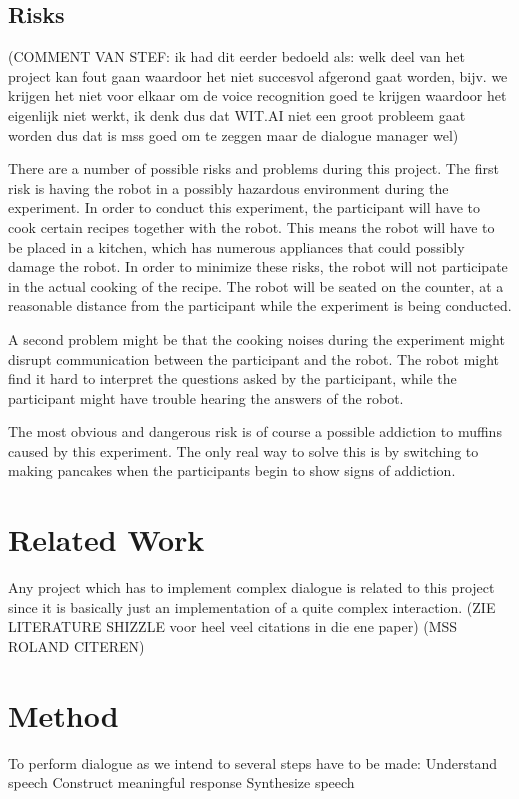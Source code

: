 \documentclass[11pt]{article} %
\begin{document}
\subsection{Risks} (COMMENT VAN STEF: ik had dit eerder bedoeld als: welk deel van het project kan fout gaan waardoor het niet succesvol afgerond gaat worden, bijv. we krijgen het niet voor elkaar om de voice recognition goed te krijgen waardoor het eigenlijk niet werkt, ik denk dus dat WIT.AI niet een groot probleem gaat worden dus dat is mss goed om te zeggen maar de dialogue manager wel)

There are a number of possible risks and problems during this project. The first risk is having the robot in a possibly hazardous environment during the experiment. In order to conduct this experiment, the participant will have to cook certain recipes together with the robot. This means the robot will have to be placed in a kitchen, which has numerous appliances that could possibly damage the robot. In order to minimize these risks, the robot will not participate in the actual cooking of the recipe. The robot will be seated on the counter, at a reasonable distance from the participant while the experiment is being conducted.

A second problem might be that the cooking noises during the experiment might disrupt communication between the participant and the robot. The robot might find it hard to interpret the questions asked by the participant, while the participant might have trouble hearing the answers of the robot.

The most obvious and dangerous risk is of course a possible addiction to muffins caused by this experiment. The only real way to solve this is by switching to making pancakes when the participants begin to show signs of addiction.


\section{Related Work}
Any project which has to implement complex dialogue is related to this project since it is basically just an implementation of a quite complex interaction. (ZIE LITERATURE SHIZZLE voor heel veel citations in die ene paper) (MSS ROLAND CITEREN)

\section{Method}
To perform dialogue as we intend to several steps have to be made:
Understand speech
Construct meaningful response
Synthesize speech
\end{document}
